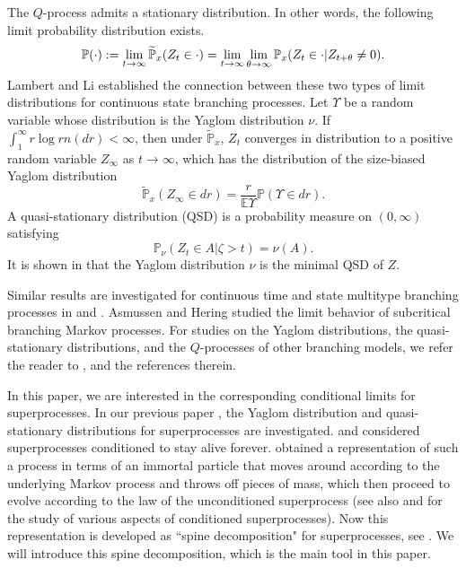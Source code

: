 \documentclass[12pt,a4paper]{amsart}
\numberwithin{equation}{section}
\theoremstyle{plain}
\theoremstyle{definition}
\theoremstyle{remark}
\begin{document}
The $Q$-process admits a stationary distribution.  In other words, the following limit probability distribution exists.
\[
\mathbb \mathbb{\mathbb{P}}(\cdot):=\lim_{t\to\infty}\widetilde{\mathbb{P}}_x(Z_t\in \cdot)=\lim_{t\to\infty}\lim_{\theta\to\infty}\mathbb{P}_x(Z_t\in\cdot|Z_{t+\theta}\neq 0).
\]
 Lambert \cite{Lambert2007Quasi-stationary} and Li \cite{Li00} established the connection between these two types of limit distributions for continuous state branching processes.  Let $\Upsilon$ be a random variable whose distribution is the Yaglom distribution $\nu$.  If $\int_1^\infty r\log r n(dr)<\infty$, then under $\widetilde{\mathbb P}_x$, $Z_t$ converges in distribution to a positive
random variable $Z_\infty$ as $t\to\infty$, which has the distribution of the size-biased Yaglom distribution
\[
\widetilde{\mathbb P}_x(Z_\infty\in dr)=\dfrac{r}{\mathbb E\Upsilon}\mathbb P(\Upsilon\in dr).
\]
 A quasi-stationary distribution (QSD) is a probability measure on $(0,\infty)$ satisfying
\[
\mathbb P_{\nu}(Z_t\in A|\zeta>t)=\nu(A).
\]
It is shown in \cite{Lambert2007Quasi-stationary} that the Yaglom distribution $\nu$ is the minimal QSD of $Z$.





  Similar results are investigated for continuous time and state multitype branching processes in \cite{Penisson2010Conditional} and \cite{Penisson2011Conditional}.  Asmussen and Hering \cite{AH} studied the limit behavior of subcritical branching %
  Markov processes.
For studies on  the Yaglom distributions,  the quasi-stationary distributions, and the $Q$-processes of other branching models, we refer the reader to
 \cite{SP}, \cite{SM} and the references therein.




In this paper, we are interested in the corresponding conditional limits for superprocesses. In our  previous paper \cite{LiuRenSongSun2020}, the Yaglom distribution and  quasi-stationary distributions for superprocesses are investigated.  \cite[Proposition $1$]{RoellyRouault1989Processus} and \cite{Evans1993Two} considered  superprocesses conditioned to  stay alive forever.  \cite{Evans1993Two} obtained a representation of such a process in terms of an immortal particle that moves around according to the underlying Markov process and throws off pieces of mass, which then proceed to evolve 
according to the law of the unconditioned superprocess
(see also \cite{EW} and \cite{EP} for the study of various aspects of conditioned superprocesses). Now this representation is developed as ``spine decomposition" for superprocesses, see .  %
We will introduce this spine decomposition, which is the main tool in this paper.
\end{document}
